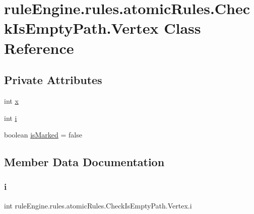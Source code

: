 \hypertarget{classrule_engine_1_1rules_1_1atomic_rules_1_1_check_is_empty_path_1_1_vertex}{}\section{rule\+Engine.\+rules.\+atomic\+Rules.\+Check\+Is\+Empty\+Path.\+Vertex Class Reference}
\label{classrule_engine_1_1rules_1_1atomic_rules_1_1_check_is_empty_path_1_1_vertex}
\subsection*{Private Attributes}
\begin{DoxyCompactItemize}
\item 
int \mbox{\hyperlink{classrule_engine_1_1rules_1_1atomic_rules_1_1_check_is_empty_path_1_1_vertex_a4c46b24afadb352970d42f9102187003}{x}}
\item 
int \mbox{\hyperlink{classrule_engine_1_1rules_1_1atomic_rules_1_1_check_is_empty_path_1_1_vertex_a9ccc7bfa3bf9ff627e96596249099d92}{i}}
\item 
boolean \mbox{\hyperlink{classrule_engine_1_1rules_1_1atomic_rules_1_1_check_is_empty_path_1_1_vertex_ac63e10248b974986e52264c4fbb7704d}{is\+Marked}} = false
\end{DoxyCompactItemize}


\subsection{Member Data Documentation}
\mbox{\label{classrule_engine_1_1rules_1_1atomic_rules_1_1_check_is_empty_path_1_1_vertex_a9ccc7bfa3bf9ff627e96596249099d92}} 
\subsubsection{\texorpdfstring{i}{i}}
{\footnotesize\ttfamily int rule\+Engine.\+rules.\+atomic\+Rules.\+Check\+Is\+Empty\+Path.\+Vertex.\+i\hspace{0.3cm}{\ttfamily [private]}}

